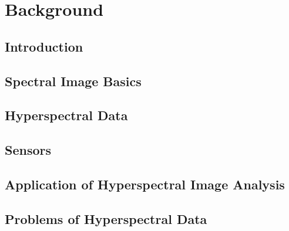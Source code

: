 \documentclass[document.tex]{subfiles}
\begin{document}
\chapter{Background}
\noindent 
\section{Introduction}

\section{Spectral Image Basics}

\section{Hyperspectral Data}

\section{Sensors}

\section{Application of Hyperspectral Image Analysis}

\section{Problems of Hyperspectral Data}
\end{document}
